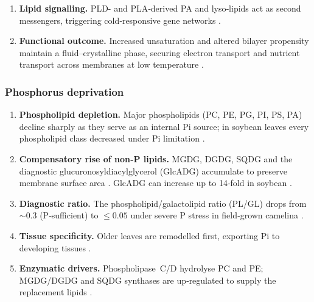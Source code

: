 \documentclass[10pt,letterpaper]{article}
\begin{document}
\begin{enumerate}[label=\textbf{\arabic*.}, leftmargin=1.2em]
  \item \textbf{Lipid signalling.}  PLD- and PLA‑derived PA and lyso‑lipids act as second messengers, triggering cold‐responsive gene networks \citep[pp.~454–456]{Low_temp_stress_Bhattacharya}.

  \item \textbf{Functional outcome.}  Increased unsaturation and altered bilayer propensity maintain a fluid–crystalline phase, securing electron transport and nutrient transport across membranes at low temperature \citep[pp.~463–465]{Low_temp_stress_Bhattacharya}.
\end{enumerate}

\subsubsection*{Phosphorus deprivation}
\label{sec:phosphorus}

\begin{enumerate}[label=\textbf{\arabic*.}, leftmargin=1.2em]
  \item \textbf{Phospholipid depletion.}  Major phospholipids (PC, PE, PG, PI, PS, PA) decline sharply as they serve as an internal Pi source; in soybean leaves every phospholipid class decreased under Pi limitation \citep[pp.~1,\,3,\,5]{lipid_remodeling_low_P_Saito}.

  \item \textbf{Compensatory rise of non‑P lipids.}  MGDG, DGDG, SQDG and the diagnostic glucuronosyldiacylglycerol (GlcADG) accumulate to preserve membrane surface area \citep[pp.~3--4]{Phosphate_deficiency_Wang}.  GlcADG can increase up to 14‑fold in soybean \citep{lipid_remodeling_low_P_Saito}.

  \item \textbf{Diagnostic ratio.}  The phospholipid/galactolipid ratio (PL/GL) drops from \(\sim\)0.3 (P‐sufficient) to \(\le 0.05\) under severe P stress in field‐grown camelina \citep[page~4]{Phosphate_deficiency_Wang}.

  \item \textbf{Tissue specificity.}  Older leaves are remodelled first, exporting Pi to developing tissues \citep[pp.~1,\,5]{lipid_remodeling_low_P_Saito}.

  \item \textbf{Enzymatic drivers.}  Phospholipase C/D hydrolyse PC and PE; MGDG/DGDG and SQDG synthases are up‑regulated to supply the replacement lipids \citep[pp.~1–2, 6]{Phosphate_scaracity_Xue}.
\end{enumerate}
\end{document}

